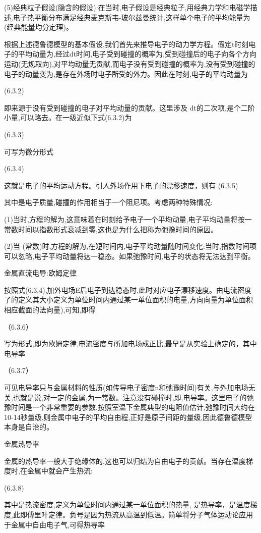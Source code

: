 (5)经典粒子假设(隐含的假设):在当时,电子假设是经典粒子,用经典力学和电磁学描述,电子热平衡分布满足经典麦克斯韦-玻尔兹曼统计,这样单个电子的平均能量为 (经典能量均分定理)。

根据上述德鲁德模型的基本假设,我们首先来推导电子的动力学方程。假定t时刻电子的平均动量为,经过dt时间,电子受到碰撞的概率为,受到碰撞后的电子向各个方向运动(无规取向),对平均动量无贡献,而电子没有受到碰撞的概率为,没有受到碰撞的电子的动量变为,是存在外场时电子所受的外力。因此在时刻,电子的平均动量为

 	(6.3.2)

即来源于没有受到碰撞的电子对平均动量的贡献。这里涉及 dt的二次项,是个二阶小量,可以略去。在一级近似下式(6.3.2)为

 	(6.3.3)

可写为微分形式

	(6.3.4)

这就是电子的平均运动方程。引人外场作用下电子的漂移速度，则有	(6.3.5)

其中是电子质量,碰撞的作用相当于一个阻尼项。考虑两种特殊情况:

(1)当时,方程的解为,这意味着在时刻给予电子一个平均动量,电子平均动量将按一常数时间以指数形式衰减到零,这也是为什么把称为弛豫时间的原因。

(2)当 (常数)时,方程的解为,在短时间内,电子平均动量随时间变化:当时,指数时间项可以忽略,电子平均动量将达一稳态。如果弛豫时间,电子的状态将无法达到平衡。

金属直流电导:欧姆定律

按照式(6.3.4),加外电场E后电子到达稳态时,此时对应电子漂移速度。由电流密度了的定义其大小定义为单位时间内通过某一单位面积的电量,方向向量为单位面积相应截面的法向量),可知,即得

	（6.3.6）

写为形式,即为欧姆定律,电流密度与所加电场成正比,最早是从实验上确定的，其中电导率

	（6.3.7）

可见电导率只与金属材料的性质(如传导电子密度n和弛豫时间)有关,与外加电场无关,也就是说,对一定的金属,为一常数。注意没有碰撞时,即,电导率。这里电子的弛豫时间是一个非常重要的参数,按照室温下金属典型的电阻值估计,弛豫时间大约在10-14秒量级,则金属中电子的平均自由程,正好是原子间距的量级,因此德鲁德模型本身是自治的。

金属热导率

金属的热导率一般大于绝缘体的,这也可以归结为自由电子的贡献。当存在温度梯度时,在金属中就会产生热流:

 	(6.3.8)

其中是热流密度,定义为单位时间内通过某一单位面积的热量, 是热导率，是温度梯度,此即傅里叶定律。负号是因为热流从高温到低温。简单将分子气体运动论应用于金属中自由电子气,可得热导率

